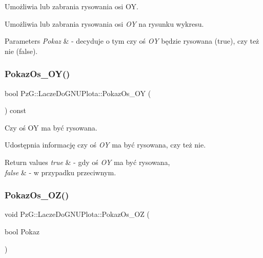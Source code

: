 Umożliwia lub zabrania rysowania osi OY. 

Umożliwia lub zabrania rysowania osi {\itshape OY} na rysunku wykresu. 
\begin{DoxyParams}{Parameters}
{\em Pokaz} & -\/ decyduje o tym czy oś {\itshape OY} będzie rysowana ({\ttfamily true}), czy też nie ({\ttfamily false}). \\
\hline
\end{DoxyParams}
\mbox{\label{classPzG_1_1LaczeDoGNUPlota_a7298f469f6932f5c808dcf620650b4b8}} 
\subsubsection{\texorpdfstring{Pokaz\+Os\+\_\+\+O\+Y()}{PokazOs\_OY()}\hspace{0.1cm}{\footnotesize\ttfamily [2/2]}}
{\footnotesize\ttfamily bool Pz\+G\+::\+Lacze\+Do\+G\+N\+U\+Plota\+::\+Pokaz\+Os\+\_\+\+OY (\begin{DoxyParamCaption}{ }\end{DoxyParamCaption}) const\hspace{0.3cm}{\ttfamily [inline]}}



Czy oś OY ma być rysowana. 

Udostępnia informację czy oś {\itshape OY} ma być rysowana, czy też nie. 
\begin{DoxyRetVals}{Return values}
{\em true} & -\/ gdy oś {\itshape OY} ma być rysowana, \\
\hline
{\em false} & -\/ w przypadku przeciwnym. \\
\hline
\end{DoxyRetVals}
\mbox{\label{classPzG_1_1LaczeDoGNUPlota_a9fabfe88cb1801a5de8923f45f514b99}} 
\subsubsection{\texorpdfstring{Pokaz\+Os\+\_\+\+O\+Z()}{PokazOs\_OZ()}\hspace{0.1cm}{\footnotesize\ttfamily [1/2]}}
{\footnotesize\ttfamily void Pz\+G\+::\+Lacze\+Do\+G\+N\+U\+Plota\+::\+Pokaz\+Os\+\_\+\+OZ (\begin{DoxyParamCaption}\item[{bool}]{Pokaz }\end{DoxyParamCaption})\hspace{0.3cm}{\ttfamily [inline]}}



